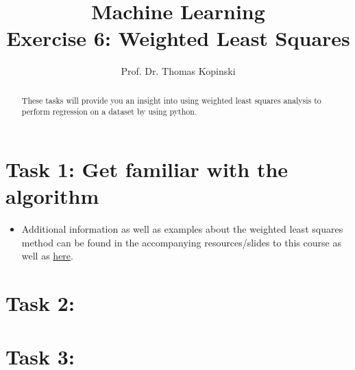 \documentclass{article}
\title{Machine Learning \\ Exercise 6: Weighted Least Squares}
\author{Prof. Dr. Thomas Kopinski}
\begin{document}
\maketitle

\begin{abstract}
These tasks will provide you an insight into using weighted least squares analysis to perform regression on a dataset by using python.
\end{abstract}

\section*{Task 1: Get familiar with the algorithm}

\begin{itemize}
    \item Additional information as well as examples about the weighted least squares method can be found in the accompanying resources/slides to this course as well as  \href{https://online.stat.psu.edu/stat501/lesson/13/13.1}{here}. 
\end{itemize}

\section*{Task 2:}

\begin{itemize}
\end{itemize}

\section*{Task 3: }

\begin{itemize}
 

\end{itemize}

%
%
\end{document}
